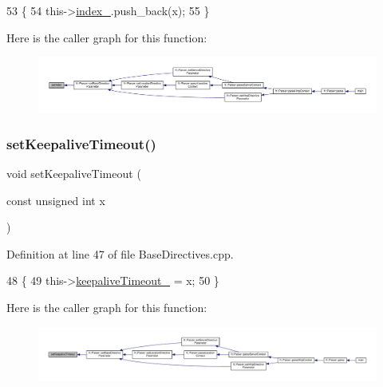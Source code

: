 \begin{DoxyCode}
53     \{
54         this->\hyperlink{classft_1_1_base_directives_a6ba30626837f300201cd32c35d50aa49}{index\_}.push\_back(x);
55     \}
\end{DoxyCode}
Here is the caller graph for this function\+:
\nopagebreak
\begin{figure}[H]
\begin{center}
\leavevmode
\includegraphics[width=350pt]{classft_1_1_base_directives_a6d3d8fd6eaaf71304128af6b3cee2a69_icgraph}
\end{center}
\end{figure}
\mbox{\label{classft_1_1_base_directives_a0818b8529872ba9622329e2118d20c39}} 
\subsubsection{\texorpdfstring{set\+Keepalive\+Timeout()}{setKeepaliveTimeout()}}
{\footnotesize\ttfamily void set\+Keepalive\+Timeout (\begin{DoxyParamCaption}\item[{const unsigned int}]{x }\end{DoxyParamCaption})\hspace{0.3cm}{\ttfamily [inherited]}}



Definition at line 47 of file Base\+Directives.\+cpp.


\begin{DoxyCode}
48     \{
49         this->\hyperlink{classft_1_1_base_directives_aa1f5f394b428d0d18765a9b9e14e648f}{keepaliveTimeout\_} = x;
50     \}
\end{DoxyCode}
Here is the caller graph for this function\+:
\nopagebreak
\begin{figure}[H]
\begin{center}
\leavevmode
\includegraphics[width=350pt]{classft_1_1_base_directives_a0818b8529872ba9622329e2118d20c39_icgraph}
\end{center}
\end{figure}
\mbox{\label{classft_1_1_location_block_a307df676bb22688bb58396dd2c457848}} 
